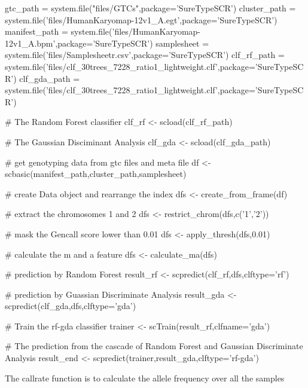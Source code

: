 \documentclass[a4paper]{book}
\begin{document}
\begin{Examples}
\begin{ExampleCode}

gtc_path = system.file("files/GTCs",package='SureTypeSCR')
cluster_path = system.file('files/HumanKaryomap-12v1_A.egt',package='SureTypeSCR')
manifest_path = system.file('files/HumanKaryomap-12v1_A.bpm',package='SureTypeSCR')
samplesheet = system.file('files/Samplesheetr.csv',package='SureTypeSCR')
clf_rf_path = system.file('files/clf_30trees_7228_ratio1_lightweight.clf',package='SureTypeSCR')
clf_gda_path = system.file('files/clf_30trees_7228_ratio1_lightweight.clf',package='SureTypeSCR')



# The Random Forest classifier
clf_rf <- scload(clf_rf_path) 

# The Gaussian Disciminant Analysis
clf_gda <- scload(clf_gda_path) 

 # get genotyping data from gtc files and meta file
df <- scbasic(manifest_path,cluster_path,samplesheet)
 
# create Data object and rearrange the index
dfs <- create_from_frame(df) 

# extract the chromosomes 1 and 2
dfs <- restrict_chrom(dfs,c('1','2')) 

# mask the Gencall score lower than 0.01
dfs <- apply_thresh(dfs,0.01) 

# calculate the m and a feature
dfs <- calculate_ma(dfs) 

# prediction by Random Forest
result_rf <- scpredict(clf_rf,dfs,clftype='rf')

# prediction by Guassian Discriminate Analysis
result_gda <- scpredict(clf_gda,dfs,clftype='gda')

# Train the rf-gda classifier
trainer <- scTrain(result_rf,clfname='gda')

# The prediction from the cascade of Random Forest and Gaussian Discriminate Analysis
result_end <- scpredict(trainer,result_gda,clftype='rf-gda') 




 
\end{ExampleCode}
\end{Examples}
%
\begin{Description}\relax
The callrate function is to calculate the allele frequency over all the samples
\end{Description}
\end{document}
